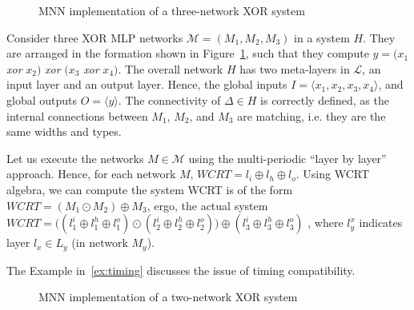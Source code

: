 \begin{figure}[h]
	\centering
	\scalebox{0.8}{}
	\caption{\ac{MNN} implementation of a three-network XOR system}
	\label{fig:three-xor}
\end{figure}

\begin{example}
	\label{ex:simple-xor}
	Consider three XOR \ac{MLP} networks $\mathcal{M} = \left(M_1, M_2, M_3\right)$ in a system $H$.
	They are arranged in the formation shown in Figure~\ref{fig:three-xor}, such that they compute $y = \big(x_1$ \textit{xor} $x_2\big)$ \textit{xor} $\big(x_3$ \textit{xor} $x_4\big)$.
	The overall network $H$ has two meta-layers in $\mathcal{L}$, an input layer and an output layer. 
	Hence, the global inputs $I = \langle x_1, x_2, x_3, x_4 \rangle$, and global outputs $O = \langle y \rangle$.
	The connectivity of $\Delta \in H$ is correctly defined, as the internal connections between $M_1$, $M_2$, and $M_3$ are matching, i.e. they are the same widths and types. 
	
	Let us execute the networks $M \in \mathcal{M}$ using the multi-periodic ``layer by layer'' approach. 
	Hence, for each network $M$, $WCRT = l_i \oplus l_h \oplus l_o$.
	Using \ac{WCRT} algebra, we can compute the system WCRT is of the form $WCRT = \left(M_1 \odot M_2\right) \oplus M_3$, ergo, the actual system \\ $WCRT = \Big(\left(l_1^i \oplus l_1^h \oplus l_1^o\right) \odot \left(l_2^i \oplus l_2^h \oplus l_2^o\right)\Big) \oplus \left(l_3^i \oplus l_3^h \oplus l_3^o\right)$ , where $l^x_y$ indicates layer $l_x \in L_y$ (in network $M_y$).
\end{example}


The Example in~\ref{ex:timing} discusses the issue of timing compatibility.

\begin{figure}[h]
	\centering
	\scalebox{0.8}{}
	\caption{\ac{MNN} implementation of a two-network XOR system}
	\label{fig:two-xor}
\end{figure}

